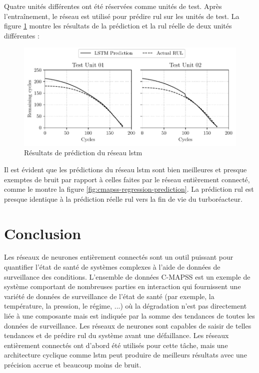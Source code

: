Quatre unités différentes ont été réservées comme unités de test. Après l'entraînement, le réseau est utilisé pour prédire \acrshort{rul} sur les unités de test. La figure \ref{fig:cmapss-lstm-prediction} montre les résultats de la prédiction et la \acrshort{rul} réelle de deux unités différentes :

\begin{figure}[h]
    \centering
    \includegraphics{figures/cmapss_lstm_regression_predictions.pdf}
    \caption{Résultats de prédiction du réseau \acrshort{lstm}}
    \label{fig:cmapss-lstm-prediction}
\end{figure}

Il est évident que les prédictions du réseau \acrshort{lstm} sont bien meilleures et presque exemptes de bruit par rapport à celles faites par le réseau entièrement connecté, comme le montre la figure \ref{fig:cmapss-regression-prediction}. La prédiction \acrshort{rul} est presque identique à la prédiction réelle \acrshort{rul} vers la fin de vie du turboréacteur.

\section{Conclusion}
Les réseaux de neurones entièrement connectés sont un outil puissant pour quantifier l'état de santé de systèmes complexes à l'aide de données de surveillance des conditions. L'ensemble de données C-MAPSS est un exemple de système comportant de nombreuses parties en interaction qui fournissent une variété de données de surveillance de l'état de santé (par exemple, la température, la pression, le régime, ...) où la dégradation n'est pas directement liée à une composante mais est indiquée par la somme des tendances de toutes les données de surveillance. Les réseaux de neurones sont capables de saisir de telles tendances et de prédire \acrshort{rul} du système avant une défaillance. Les réseaux entièrement connectés ont d'abord été utilisés pour cette tâche, mais une architecture cyclique comme \acrshort{lstm} peut produire de meilleurs résultats avec une précision accrue et beaucoup moins de bruit.

